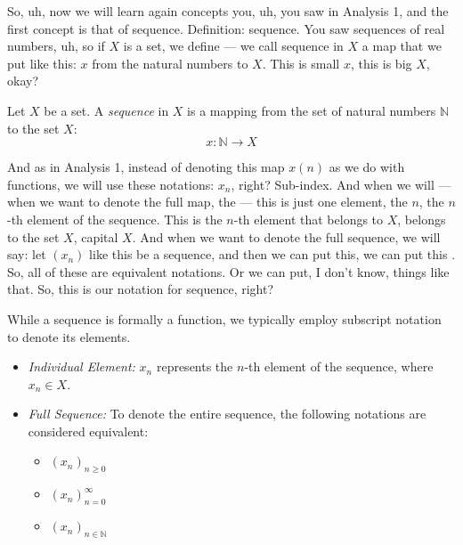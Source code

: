 \begin{spoken-clean}[00:00:50 - 00:01:50]
So, uh, now we will learn again concepts you, uh, you saw in Analysis 1, and the first concept is that of sequence.  Definition: sequence. You saw sequences of real numbers, uh, so if $X$ is a set, we define — we call sequence in $X$ a map that we put like this: $x$ from the natural numbers to $X$. This is small $x$, this is big $X$, okay?
\end{spoken-clean}

\begin{math-stroke}
\begin{definition}[Sequence]\label{def:sequence}
Let $X$ be a set. A \emph{sequence} in $X$ is a mapping from the set of natural numbers $\mathbb{N}$ to the set $X$:
\[ x: \mathbb{N} \to X \]
\end{definition}
\end{math-stroke}

\begin{spoken-clean}[00:01:50 - 00:03:00]
And as in Analysis 1, instead of denoting this map $x(n)$ as we do with functions, we will use these notations: $x_n$, right? Sub-index. And when we will — when we want to denote the full map, the — this is just one element, the $n$, the $n$-th element of the sequence. This is the $n$-th element that belongs to $X$, belongs to the set $X$, capital $X$. And when we want to denote the full sequence, we will say: let $(x_n)$ like this be a sequence, and then we can put this, we can put this . So, all of these are equivalent notations. Or we can put, I don't know, things like that. So, this is our notation for sequence, right?
\end{spoken-clean}

\begin{math-stroke}
While a sequence is formally a function, we typically employ subscript notation to denote its elements.
\begin{itemize}
    \setcounter{enumi}{0} \item \emph{Individual Element:} $x_n$ represents the $n$-th element of the sequence, where $x_n \in X$.
    \setcounter{enumi}{1} \item \emph{Full Sequence:} To denote the entire sequence, the following notations are considered equivalent:
    \begin{itemize}
        \item $(x_n)_{n \ge 0}$
        \item $(x_n)_{n=0}^{\infty}$
        \item $(x_n)_{n \in \mathbb{N}}$
    \end{itemize}
\end{itemize}
\end{math-stroke}


